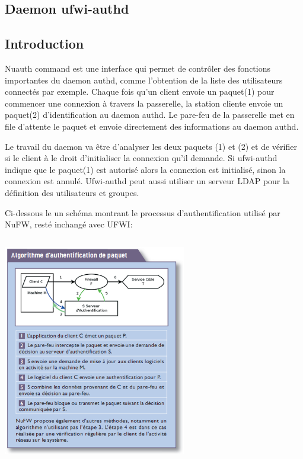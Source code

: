 \documentclass[12pt]{report}
\begin{document}
\begin{itemize}
\chapter{Daemon ufwi-authd}
\section{Introduction}

Nuauth command est une interface qui permet de contrôler des fonctions importantes du daemon authd, 
comme l'obtention de la liste des utilisateurs connectés par exemple.
Chaque fois qu'un client envoie un paquet(1) pour commencer une connexion à travers la 
passerelle, la station cliente envoie un paquet(2) d'identification au daemon authd. Le 
pare-feu de la passerelle met en file d'attente le paquet et envoie directement des 
informations au daemon authd.

Le travail du daemon va être d'analyser les deux paquets (1) et (2) et de vérifier si 
le client à le droit d'initialiser la connexion qu'il demande.
Si ufwi-authd indique que le paquet(1) est autorisé alors la connexion est initialisé,
sinon la connexion est annulé. Ufwi-authd peut aussi utiliser un serveur LDAP pour la
définition des utilisateurs et groupes.

Ci-dessous le un schéma montrant le processus d'authentification utilisé par NuFW, resté inchangé avec UFWI:

\begin{center}
  \includegraphics[width=8cm,height=10cm]{images/auth.png}
\end{center}


\end{itemize}
\end{document}
